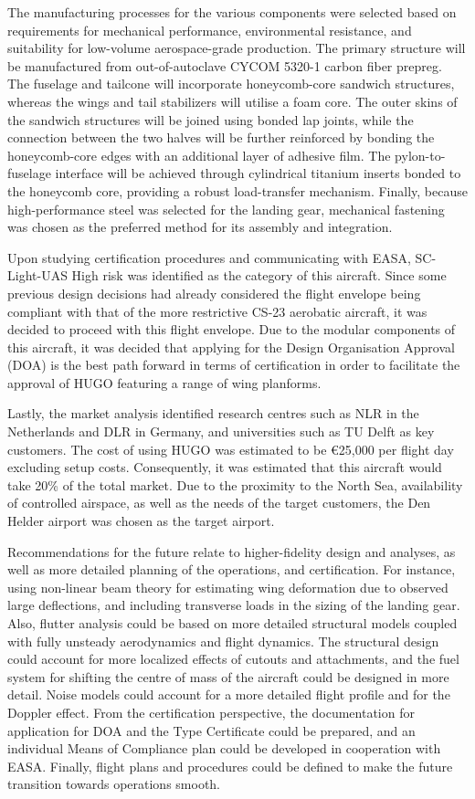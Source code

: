 The manufacturing processes for the various components were selected based on requirements for mechanical performance, environmental resistance, and suitability for low-volume aerospace-grade production. The primary structure will be manufactured from out-of-autoclave CYCOM 5320-1 carbon fiber prepreg. The fuselage and tailcone will incorporate honeycomb-core sandwich structures, whereas the wings and tail stabilizers will utilise a foam core. The outer skins of the sandwich structures will be joined using bonded lap joints, while the connection between the two halves will be further reinforced by bonding the honeycomb-core edges with an additional layer of adhesive film. The pylon-to-fuselage interface will be achieved through cylindrical titanium inserts bonded to the honeycomb core, providing a robust load-transfer mechanism. Finally, because high-performance steel was selected for the landing gear, mechanical fastening was chosen as the preferred method for its assembly and integration.

Upon studying certification procedures and communicating with EASA, SC-Light-UAS High risk was identified as the category of this aircraft. Since some previous design decisions had already considered the flight envelope being compliant with that of the more restrictive CS-23 aerobatic aircraft, it was decided to proceed with this flight envelope. Due to the modular components of this aircraft, it was decided that applying for the Design Organisation Approval (DOA) is the best path forward in terms of certification in order to facilitate the approval of HUGO featuring a range of wing planforms.

Lastly, the market analysis identified research centres such as NLR in the Netherlands and DLR in Germany, and universities such as TU Delft as key customers. The cost of using HUGO was estimated to be €25,000 per flight day excluding setup costs. Consequently, it was estimated that this aircraft would take 20\% of the total market. Due to the proximity to the North Sea, availability of controlled airspace, as well as the needs of the target customers, the Den Helder airport was chosen as the target airport. 

Recommendations for the future relate to higher-fidelity design and analyses, as well as more detailed planning of the operations, and certification. For instance, using non-linear beam theory for estimating wing deformation due to observed large deflections, and including transverse loads in the sizing of the landing gear. Also, flutter analysis could be based on more detailed structural models coupled with fully unsteady aerodynamics and flight dynamics. The structural design could account for more localized effects of cutouts and attachments, and the fuel system for shifting the centre of mass of the aircraft could be designed in more detail. Noise models could account for a more detailed flight profile and for the Doppler effect. From the certification perspective, the documentation for application for DOA and the Type Certificate could be prepared, and an individual Means of Compliance plan could be developed in cooperation with EASA.  Finally, flight plans and procedures could be defined to make the future transition towards operations smooth.
